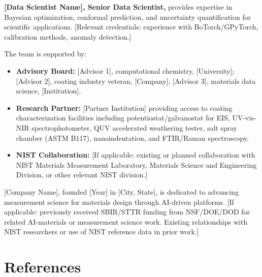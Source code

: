 \documentclass[11pt,letterpaper]{article}
\begin{document}
\textbf{[Data Scientist Name], Senior Data Scientist,} provides expertise in Bayesian optimization, conformal prediction, and uncertainty quantification for scientific applications. [Relevant credentials: experience with BoTorch/GPyTorch, calibration methods, anomaly detection.]

The team is supported by:
\begin{itemize}[leftmargin=*]
  \item \textbf{Advisory Board:} [Advisor 1], computational chemistry, [University]; [Advisor 2], coating industry veteran, [Company]; [Advisor 3], materials data science, [Institution].
  \item \textbf{Research Partner:} [Partner Institution] providing access to coating characterization facilities including potentiostat/galvanostat for EIS, UV-vis-NIR spectrophotometer, QUV accelerated weathering tester, salt spray chamber (ASTM B117), nanoindentation, and FTIR/Raman spectroscopy.
  \item \textbf{NIST Collaboration:} [If applicable: existing or planned collaboration with NIST Materials Measurement Laboratory, Materials Science and Engineering Division, or other relevant NIST division.]
\end{itemize}

[Company Name], founded [Year] in [City, State], is dedicated to advancing measurement science for materials design through AI-driven platforms. [If applicable: previously received SBIR/STTR funding from NSF/DOE/DOD for related AI-materials or measurement science work. Existing relationships with NIST researchers or use of NIST reference data in prior work.]

\section{References}
\label{sec:references}
\end{document}
